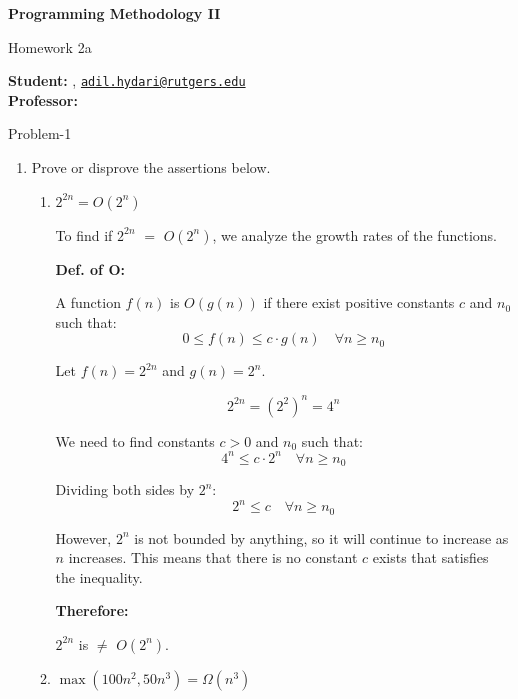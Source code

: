 




	
	\begin{Large}
		\textsf{\textbf{Programming Methodology II}}
		
		Homework 2a
	\end{Large}
	
	\vspace{1ex}
	
	\textsf{\textbf{Student:}} , \href{mailto:adil.hydari@rutgers.edu}{\texttt{adil.hydari@rutgers.edu}}\\
	\textsf{\textbf{Professor:}} 
	
	
	\vspace{2ex}
	
\begin{problem}{}{Problem-1}
	\begin{enumerate}
		\item Prove or disprove the assertions below.
		\begin{enumerate}[label=(\alph*)]
			\item $2^{2n} = O(2^n)$
			
			To find if \(2^{2n}\) $=$ \(O(2^n)\), we analyze the growth rates of the functions.
			
			\textbf{Def. of O:}
			
			A function \(f(n)\) is \(O(g(n))\) if there exist positive constants \(c\) and \(n_0\) such that:
			\[
			0 \leq f(n) \leq c \cdot g(n) \quad \forall n \geq n_0
			\]
			
			Let \(f(n) = 2^{2n}\) and \(g(n) = 2^n\).
			
			\[
			2^{2n} = (2^2)^n = 4^n
			\]
			
			We need to find constants \(c > 0\) and \(n_0\) such that:
			\[
			4^n \leq c \cdot 2^n \quad \forall n \geq n_0
			\]
			
			Dividing both sides by \(2^n\):
			\[
			2^n \leq c \quad \forall n \geq n_0
			\]
			
			However, \(2^n\) is not bounded by anything, so it will continue to increase as \(n\) increases. This means that there is no constant \(c\) exists that satisfies the inequality.
			
			\textbf{Therefore:}
			
			\(2^{2n}\) is $\neq$ \(O(2^n)\).
			
		\item $\max(100n^2, 50n^3) = \Omega(n^3)$
		

\end{enumerate}
\end{enumerate}
\end{problem}
